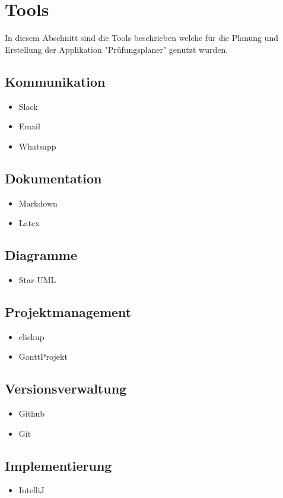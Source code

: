 \section{Tools}

In diesem Abschnitt sind die Tools beschrieben welche für die Planung und Erstellung der Applikation "Prüfungsplaner" genutzt wurden.

\subsection{Kommunikation} 
\begin{itemize}
	\item Slack
	\item Email
	\item Whatsapp
\end{itemize}
 
\subsection{Dokumentation}
\begin{itemize}
	\item Markdown
	\item Latex
\end{itemize} 

\subsection{Diagramme} 
\begin{itemize}
	\item Star-UML
\end{itemize}

\subsection{Projektmanagement}
\begin{itemize}
	\item clickup
	\item GanttProjekt
\end{itemize} 
  
\subsection{Versionsverwaltung}
\begin{itemize}
	\item Github
	\item Git
\end{itemize}
 
\subsection{Implementierung}
\begin{itemize}
	\item IntelliJ
\end{itemize}


